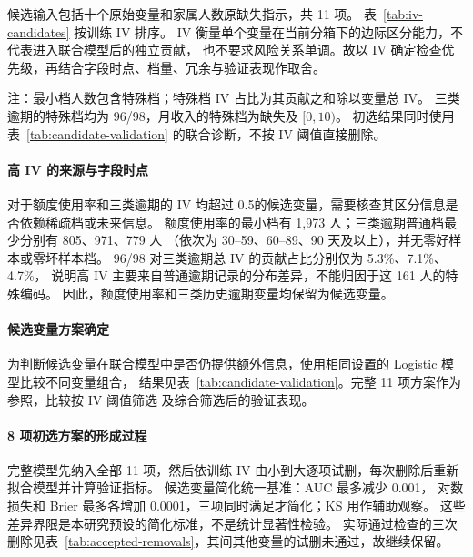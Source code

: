 
候选输入包括十个原始变量和家属人数原缺失指示，共 11 项。
表~\ref{tab:iv-candidates} 按训练 IV 排序。
IV 衡量单个变量在当前分箱下的边际区分能力，不代表进入联合模型后的独立贡献，
也不要求风险关系单调。故以 IV 确定检查优先级，再结合字段时点、档量、冗余与验证表现作取舍。

\begin{table}[!htbp]
  \centering
  \caption{候选变量的训练集 IV 与初选结果}
  \label{tab:iv-candidates}
  \footnotesize
  \setlength{\tabcolsep}{3.5pt}
  \renewcommand{\arraystretch}{1.05}
  
  \begin{minipage}{\linewidth}
    \footnotesize
    注：最小档人数包含特殊档；特殊档 IV 占比为其贡献之和除以变量总 IV。
    三类逾期的特殊档均为 96/98，月收入的特殊档为缺失及 $[0,10)$。
    初选结果同时使用表~\ref{tab:candidate-validation} 的联合诊断，不按 IV 阈值直接删除。
  \end{minipage}
\end{table}

\paragraph{高 IV 的来源与字段时点}
对于额度使用率和三类逾期的 IV 均超过 0.5的候选变量，需要核查其区分信息是否依赖稀疏档或未来信息。
额度使用率的最小档有 1,973 人；三类逾期普通档最少分别有 805、971、779 人
（依次为 30--59、60--89、90 天及以上），并无零好样本或零坏样本档。
96/98 对三类逾期总 IV 的贡献占比分别仅为 5.3\%、7.1\%、4.7\%，
说明高 IV 主要来自普通逾期记录的分布差异，不能归因于这 161 人的特殊编码。
因此，额度使用率和三类历史逾期变量均保留为候选变量。

\paragraph{候选变量方案确定}
为判断候选变量在联合模型中是否仍提供额外信息，使用相同设置的 Logistic 模型比较不同变量组合，
结果见表~\ref{tab:candidate-validation}。完整 11 项方案作为参照，比较按 IV 阈值筛选
及综合筛选后的验证表现。

\begin{table}[!htbp]
  \centering
  \caption{候选变量方案的验证集诊断表现}
  \label{tab:candidate-validation}
  \footnotesize
  \setlength{\tabcolsep}{5pt}
  \renewcommand{\arraystretch}{1.05}
  
\end{table}

\paragraph{8 项初选方案的形成过程}
完整模型先纳入全部 11 项，然后依训练 IV 由小到大逐项试删，每次删除后重新拟合模型并计算验证指标。
候选变量简化统一基准：AUC 最多减少 0.001，
对数损失和 Brier 最多各增加 0.0001，三项同时满足才简化；KS 用作辅助观察。
这些差异界限是本研究预设的简化标准，不是统计显著性检验。
实际通过检查的三次删除见表~\ref{tab:accepted-removals}，其间其他变量的试删未通过，故继续保留。

